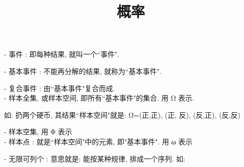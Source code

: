 \documentclass[UTF8]{ctexart}
\title{概率}
\begin{document}
	\tableofcontents %
	\date{} %
	\maketitle  %
	
	
	- 事件 : 即每种结果, 就叫一个``事件".
	
	- 基本事件 : 不能再分解的结果, 就称为``基本事件".
	
	- 复合事件 : 由``基本事件"复合而成. \\
	
	- 样本全集, 或样本空间, 即所有``基本事件"的集合. 用 Ω 表示.  
	
	如: 扔两个硬币, 其结果``样本空间"就是: Ω={(正,正), (正, 反), (反,正), (反,反)}
	
	- 样本空集, 用 Φ 表示 \\
	
	- 样本点 : 就是``样本空间"中的元素, 即"基本事件". 用 ω 表示
	
	- 无限可列个 : 意思就是: 能按某种规律, 排成一个序列. 如:
	
	
	
	
	
	
	
	
\end{document}
